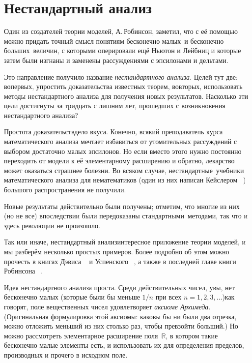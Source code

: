 \section{Нестандартный анализ}

Один из создателей теории моделей, А.\,Робинсон,%
заметил, что с
её помощью можно придать точный смысл понятиям  бесконечно
малых\ и  бесконечно больших\ величин, с которыми
оперировали ещё Ньютон%
и Лейбниц%
и которые затем были изгнаны и
заменены рассуждениями с эпсилонами и дельтами.

Это направление получило название \emph{нестандартного анализа}.%
Целей тут две: во\д первых, упростить доказательства известных
теорем, во\д вторых, использовать методы нестандартного анализа
для получения новых результатов. Насколько эти цели достигнуты
за тридцать с лишним лет, прошедших с возникновения нестандартного
анализа?

Простота доказательств\т дело вкуса. Конечно, всякий
преподаватель курса математического анализа меч\-тает избавиться
от утомительных рассуждений с выбором достаточно малых
эпсилонов. Но если вместо этого нужно постоянно переходить от
модели к её элементарному расширению и обратно, лекарство может
оказаться страшнее болезни. Во всяком случае, 
нестандартные\ учебники математического анализа для
нематематиков (один из них написан
Кейслером%
%
~\cite{keisler-nonstandard}) большого распространения не
получили.

Новые результаты действительно были получены; отметим, что
многие из них (но не все) впоследствии были передоказаны 
стандартными\ методами, так что и здесь революции не
произошло.

Так или иначе, нестандартный анализ\т интересное приложение
теории моделей, и мы разберём несколько простых примеров. Более
подробно об этом можно прочесть в книгах
Дэвиса%
%
~\cite{davis-nonstandard} и
Успенского%
%
~\cite{uspensky-nonstandard}, а также в последней
главе книги Робинсона%
%
~\cite{robinson}.

Идея нестандартного анализа проста. Среди действительных чисел,
увы, нет бесконечно малых (которые были бы меньше $1/n$ при всех
$n=1,2,3,\dots$)\т как говорят, поле вещественных чисел
удовлетворяет \emph{аксиоме Ар\-хи\-меда}.%
%
(Оригинальная
формулировка этой аксиомы: каковы бы ни были два отрезка, можно
отложить меньший из них столько раз, чтобы превзойти больший.)
Но можно рассмотреть элементарное расширение поля~$\mathbb{R}$,
в котором такие бесконечно малые элементы есть, и использовать
их для определения пределов, производных и прочего в исходном
поле.

